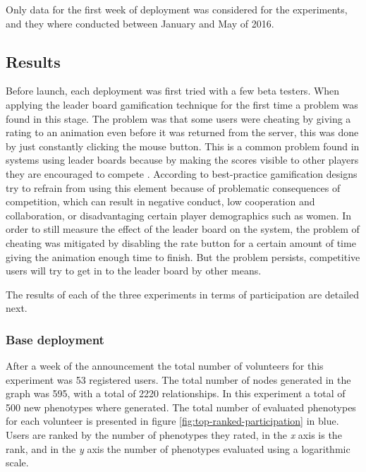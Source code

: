\documentclass[conference]{IEEEtran}
\begin{document}
Only data for the first week of deployment was considered for the experiments, and they where conducted 
between January and May of 2016. 

\subsection{Results}
\label{sec:results}

Before launch, each deployment was first tried with a few beta testers. When applying the leader board
gamification technique for the first time a problem was found in this stage. The problem was that some 
users were cheating by giving a rating to an animation even before it was returned from the server, this was done by just
constantly clicking the mouse button. This is a common problem found in systems using leader boards because
by making the scores visible to other players they are encouraged to compete \cite{hickman2010total}. 
According to \cite{kumar2013gamification} best-practice gamification designs try to
refrain from using this element because of  problematic consequences of competition, which can result 
in negative conduct, low cooperation and collaboration, or disadvantaging certain player
demographics such as women. In order to still measure the effect of the leader board on the system, the 
problem of cheating was mitigated by disabling the rate button for a certain amount of time giving the animation
enough time to finish. But the problem persists, competitive users will try to get in to the leader board by other means.

The results of each of the three experiments in terms of participation are detailed next.

\subsubsection{ Base deployment}
After a week of the announcement the total number of volunteers for this experiment was 53 registered users. 
The total number of nodes generated in the graph was 595, with a total of 2220 relationships. In this
experiment a total of 500 new phenotypes where generated. The total number of evaluated
phenotypes for each volunteer is presented in figure
\ref{fig:top-ranked-participation} in blue. Users are ranked by
the number of phenotypes they rated, in the \emph{x} axis is the rank, and in the \emph{y} axis 
the number of phenotypes evaluated using a logarithmic scale.   %
\end{document}
